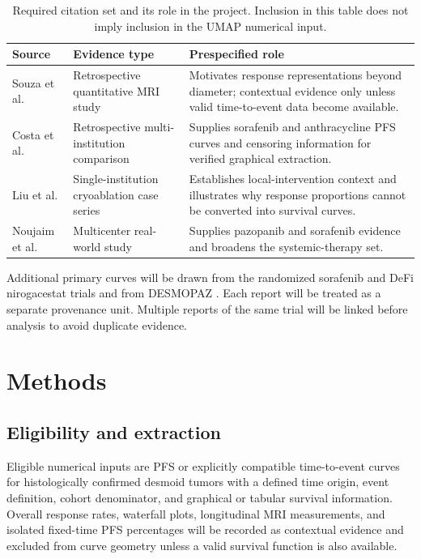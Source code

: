 \documentclass[17pt]{extarticle}
\begin{document}
\begin{table}[ht]
\centering
\caption{Required citation set and its role in the project. Inclusion in this table does not imply inclusion in the UMAP numerical input.}
\begin{tabularx}{\textwidth}{>{\raggedright\arraybackslash}p{2.5cm}>{\raggedright\arraybackslash}p{3.7cm}X}
\toprule
Source & Evidence type & Prespecified role \\
\midrule
Souza et al. \citep{souza2023t2} & Retrospective quantitative MRI study & Motivates response representations beyond diameter; contextual evidence only unless valid time-to-event data become available. \\
Costa et al. \citep{costa2025sorafenib} & Retrospective multi-institution comparison & Supplies sorafenib and anthracycline PFS curves and censoring information for verified graphical extraction. \\
Liu et al. \citep{liu2022cryo} & Single-institution cryoablation case series & Establishes local-intervention context and illustrates why response proportions cannot be converted into survival curves. \\
Noujaim et al. \citep{noujaim2024realworld} & Multicenter real-world study & Supplies pazopanib and sorafenib evidence and broadens the systemic-therapy set. \\
\bottomrule
\end{tabularx}
\end{table}

Additional primary curves will be drawn from the randomized sorafenib and DeFi nirogacestat trials and from DESMOPAZ \citep{gounder2018sorafenib,gounder2023nirogacestat,toulmonde2019desmopaz}. Each report will be treated as a separate provenance unit. Multiple reports of the same trial will be linked before analysis to avoid duplicate evidence.

\section{Methods}

\subsection{Eligibility and extraction}

Eligible numerical inputs are PFS or explicitly compatible time-to-event curves for histologically confirmed desmoid tumors with a defined time origin, event definition, cohort denominator, and graphical or tabular survival information. Overall response rates, waterfall plots, longitudinal MRI measurements, and isolated fixed-time PFS percentages will be recorded as contextual evidence and excluded from curve geometry unless a valid survival function is also available.
\end{document}
